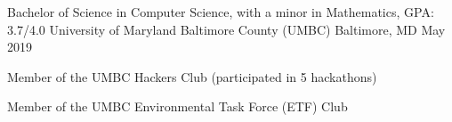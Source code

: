 
\begin{cventries}
  \cventry
    {Bachelor of Science in Computer Science, with a minor in Mathematics, GPA: 3.7/4.0} %
    {University of Maryland Baltimore County (UMBC)} %
    {Baltimore, MD} %
    {May 2019} %
    {
      \begin{cvitems}
        \item{Member of the UMBC Hackers Club (participated in 5 hackathons)}
        \item{Member of the UMBC Environmental Task Force (ETF) Club}
      \end{cvitems}
    }
\end{cventries}
